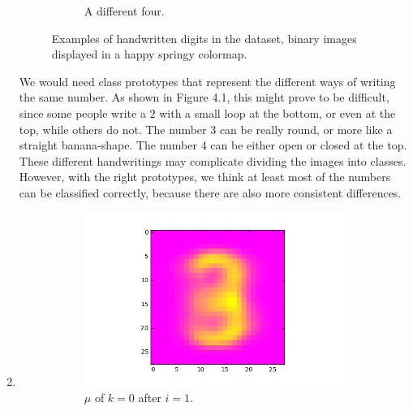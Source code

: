 \documentclass[a4paper,10pt]{article}
\numberwithin{equation}{section} %
\numberwithin{figure}{section} %
\numberwithin{table}{section} %
\theoremstyle{mytheor}
\begin{document}
\begin{enumerate}
\begin{figure}[h!]
\begin{subfigure}[b]{0.26\textwidth}
				\caption{A different four.}
			\end{subfigure}
   			\caption{\vspace{-0.1cm} Examples of handwritten digits in the dataset, binary images displayed in a happy springy colormap.}\vspace{-0.2cm}
  		\end{figure}
		We would need class prototypes that represent the different ways of writing the same number. As shown in Figure 4.1, this might prove to be difficult, since some people write a $2$ with a small loop at the bottom, or even at the top, while others do not. The number $3$ can be really round, or more like a straight banana-shape. The number $4$ can be either open or closed at the top. These different handwritings may complicate dividing the images into classes. However, with the right prototypes, we think at least most of the numbers can be classified correctly, because there are also more consistent differences.
	\item \begin{figure}[h!]
			\centering
			\begin{subfigure}[b]{0.26\textwidth}
				\includegraphics[width=\textwidth]{digits/0_k3_class0.png}\vspace{-0.4cm}
				\caption{$\mu$ of $k=0$ after $i=1$.}
			\end{subfigure}
			\begin{subfigure}[b]{0.26\textwidth}

\end{subfigure}
\end{figure}
\end{enumerate}
\end{document}
